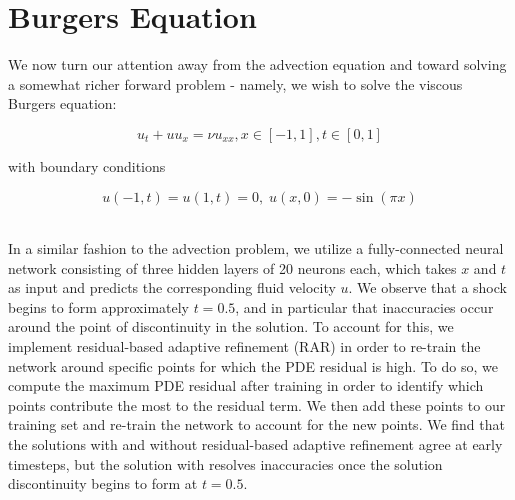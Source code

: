 \documentclass[letterpaper,11pt]{article}
\begin{document}
    \section{Burgers Equation}
    We now turn our attention away from the advection equation and toward solving a somewhat richer forward problem - 
    namely, we wish to solve the viscous Burgers equation:

    $$
    u_t + u u_x = \nu u_{xx}, x \in [-1, 1], t \in [0, 1]
    $$

    \noindent with boundary conditions

    $$
    u(-1, t) = u(1, t) = 0,\; u(x, 0) = -\sin{(\pi x)}
    $$

    \ \\
    In a similar fashion to the advection problem, we utilize a fully-connected neural network consisting of
    three hidden layers of 20 neurons each, which takes $x$ and $t$ as input and predicts the corresponding fluid 
    velocity $u$.  We observe that a shock begins to form approximately $t = 0.5$, and in particular that inaccuracies 
    occur around the point of discontinuity in the solution. To account for this, we implement residual-based adaptive 
    refinement (RAR) in order to re-train the network around specific points for which the PDE residual is 
    high.\cite{WU2023115671} To do so, we compute the maximum PDE residual after training in order to identify which 
    points contribute the most to the residual term. We then add these points to our training set and re-train the 
    network to account for the new points. We find that the solutions with and without residual-based adaptive 
    refinement agree at early timesteps, but the solution with resolves inaccuracies once the solution discontinuity 
    begins to form at $t = 0.5$.
\end{document}
